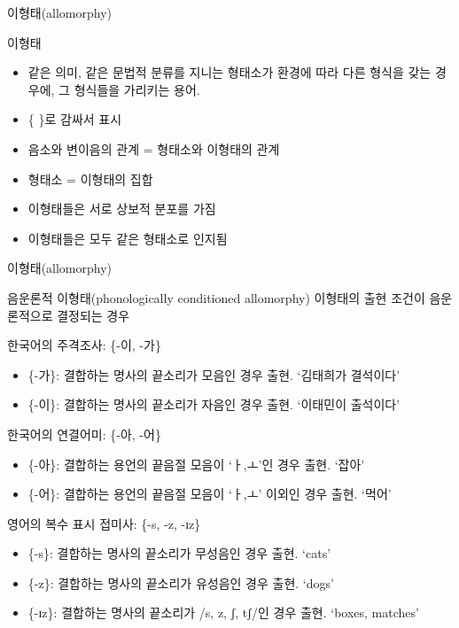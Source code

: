\documentclass[11pt, aspectratio=169]{beamer}
\newcommand{\textds}[1]{{\ipafont #1}}
\begin{document}
\begin{frame}[t]{이형태(allomorphy)}
  \begin{block}{이형태}
    \begin{itemize}
      \item 같은 의미, 같은 문법적 분류를 지니는 형태소가 환경에 따라 다른 형식을 갖는 경우에, 그 형식들을 가리키는 용어. 
      \item \{ \}로 감싸서 표시
    \end{itemize}
  \end{block}
  \begin{itemize}
    \item 음소와 변이음의 관계 = 형태소와 이형태의 관계
    \item 형태소 = 이형태의 집합
    \item 이형태들은 서로 상보적 분포를 가짐
    \item 이형태들은 모두 같은 형태소로 인지됨
  \end{itemize}
\end{frame}

\begin{frame}[t]{이형태(allomorphy)}
  \begin{block}{음운론적 이형태(phonologically conditioned allomorphy)}
    이형태의 출현 조건이 음운론적으로 결정되는 경우
  \end{block}
  한국어의 주격조사: \{-이, -가\}
  \begin{itemize}
    \item \{-가\}: 결합하는 명사의 끝소리가 모음인 경우 출현. ‘김태희가 결석이다’
    \item \{-이\}: 결합하는 명사의 끝소리가 자음인 경우 출현. ‘이태민이 출석이다’
  \end{itemize}
  한국어의 연결어미: \{-아, -어\}
  \begin{itemize}
    \item \{-아\}: 결합하는 용언의 끝음절 모음이 ‘ㅏ,ㅗ’인 경우 출현. ‘잡아’ 
    \item \{-어\}: 결합하는 용언의 끝음절 모음이 ‘ㅏ,ㅗ’ 이외인 경우 출현. ‘먹어’
  \end{itemize}
  영어의 복수 표시 접미사: \{\textds{-s, -z, -ɪz}\}
  \begin{itemize}
    \item \{\textds{-s}\}: 결합하는 명사의 끝소리가 무성음인 경우 출현. ‘cats’
    \item \{\textds{-z}\}: 결합하는 명사의 끝소리가 유성음인 경우 출현. ‘dogs’
    \item \{\textds{-ɪz}\}: 결합하는 명사의 끝소리가 /\textds{s, z, ʃ, tʃ}/인 경우 출현. ‘boxes, matches’
  \end{itemize}
\end{frame}
\end{document}
